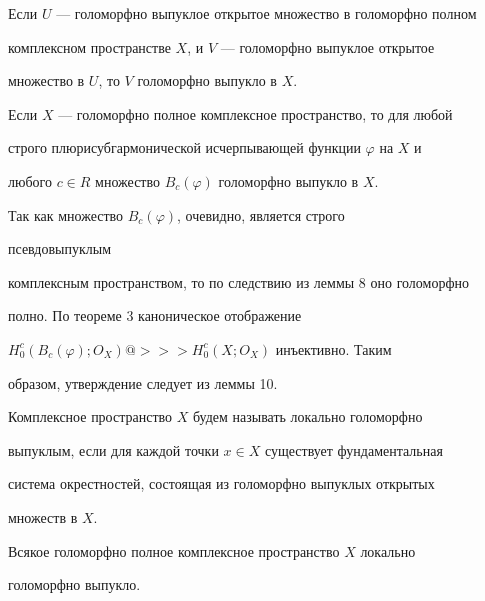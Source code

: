  


\begin{cornonum} 


Если $U$ --- голоморфно выпуклое открытое множество в голоморфно полном 


комплексном пространстве $X$, и $V$ --- голоморфно выпуклое открытое 


множество в $U$, то $V$ голоморфно выпукло в $X$. 


\end{cornonum} 


 


\begin{lem} 


Если $X$ --- голоморфно полное комплексное пространство, то для любой 


строго плюрисубгармонической исчерпывающей функции $\varphi$ на $X$ и 


любого $c\in R$ множество $B_c(\varphi)$ голоморфно выпукло в $X$. 


\end{lem} 


 


\begin{pf} 


Так как множество $B_c(\varphi)$, очевидно, является строго 


псевдовыпуклым 


комплексным пространством, то по следствию из леммы 8 оно голоморфно 


полно. По теореме 3 каноническое отображение 


$H^c_0(B_c(\varphi);O_X)@>>>H^c_0(X;O_X)$ инъективно. Таким 


образом, утверждение следует из леммы 10. 


\end{pf} 


 


Комплексное пространство $X$ будем называть локально голоморфно 


выпуклым, если для каждой точки $x\in X$ существует фундаментальная 


система окрестностей, состоящая из голоморфно выпуклых открытых 


множеств в $X$. 


 


\begin{lem} 


Всякое голоморфно полное комплексное пространство $X$ локально 


голоморфно выпукло. 


\end{lem} 


